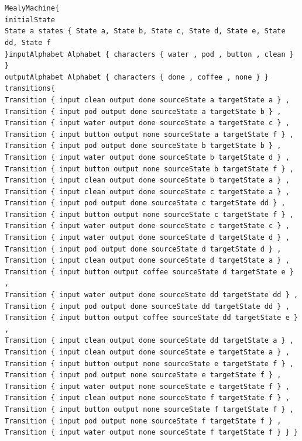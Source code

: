 \appendix
\chapter*{\fuggelek}
\setcounter{chapter}{\appendixnumber}


\begin{lstlisting}[caption=The Mealy machine seen in Fig.\ref{fig:coffeemealy} in the form of the Xtext the grammar described in Listing \ref{li:xtext}.,label=li:coffeemealy]
MealyMachine{
initialState 
State a states { State a, State b, State c, State d, State e, State dd, State f
}inputAlphabet Alphabet { characters { water , pod , button , clean } }
outputAlphabet Alphabet { characters { done , coffee , none } }
transitions{ 
Transition { input clean output done sourceState a targetState a } , 
Transition { input pod output done sourceState a targetState b } , 
Transition { input water output done sourceState a targetState c } , 
Transition { input button output none sourceState a targetState f } , 
Transition { input pod output done sourceState b targetState b } , 
Transition { input water output done sourceState b targetState d } , 
Transition { input button output none sourceState b targetState f } , 
Transition { input clean output done sourceState b targetState a } , 
Transition { input clean output done sourceState c targetState a } , 
Transition { input pod output done sourceState c targetState dd } , 
Transition { input button output none sourceState c targetState f } , 
Transition { input water output done sourceState c targetState c } , 
Transition { input water output done sourceState d targetState d } , 
Transition { input pod output done sourceState d targetState d } , 
Transition { input clean output done sourceState d targetState a } , 
Transition { input button output coffee sourceState d targetState e } , 
Transition { input water output done sourceState dd targetState dd } , 
Transition { input pod output done sourceState dd targetState dd } , 
Transition { input button output coffee sourceState dd targetState e } , 
Transition { input clean output done sourceState dd targetState a } , 
Transition { input clean output done sourceState e targetState a } , 
Transition { input button output none sourceState e targetState f } , 
Transition { input pod output none sourceState e targetState f } , 
Transition { input water output none sourceState e targetState f } , 
Transition { input clean output none sourceState f targetState f } , 
Transition { input button output none sourceState f targetState f } , 
Transition { input pod output none sourceState f targetState f } , 
Transition { input water output none sourceState f targetState f } } }
\end{lstlisting}

